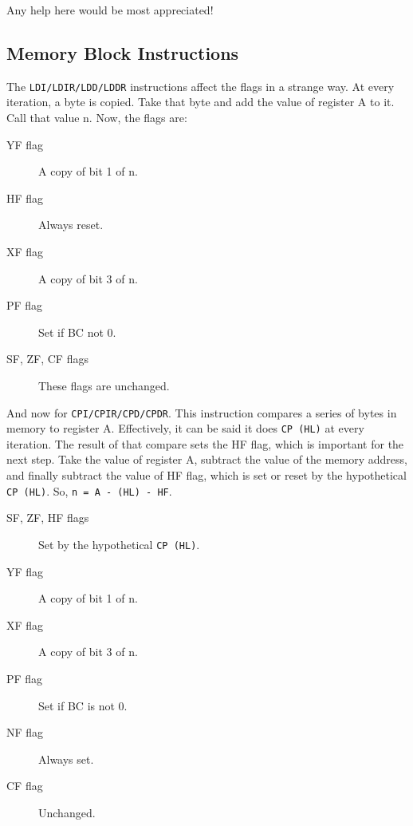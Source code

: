 \documentclass[twoside,openright,a4paper]{book}
\begin{document}
Any help here would be most appreciated!


\subsection{Memory Block Instructions \cite{mrison}}
\label{block_mem}

The {\tt LDI/LDIR/LDD/LDDR} instructions affect the flags in a strange way. At every iteration, a byte is copied. Take that byte and add the value of register A to it. Call that value n. Now, the flags are:

\begin{description}
 
	\item[YF flag]
	A copy of bit 1 of n.

	\item[HF flag]
	Always reset.

	\item[XF flag]
	A copy of bit 3 of n.

	\item[PF flag]
	Set if BC not 0.

	\item[SF, ZF, CF flags]
	These flags are unchanged.

\end{description}

And now for {\tt CPI/CPIR/CPD/CPDR}. This instruction compares a series of bytes in memory to register A. Effectively, it can be said it does {\tt CP (HL)} at every iteration. The result of that compare sets the HF flag, which is important for the next step. Take the value of register A, subtract the value of the memory address, and finally subtract the value of HF flag, which is set or reset by the hypothetical {\tt CP (HL)}. So, {\tt n = A - (HL) - HF}.

\begin{description}

	\item[SF, ZF, HF flags]
	Set by the hypothetical {\tt CP (HL)}.

	\item[YF flag]
	A copy of bit 1 of n.

	\item[XF flag]
	A copy of bit 3 of n.

	\item[PF flag]
	Set if BC is not 0.

	\item[NF flag]
	Always set.

	\item[CF flag]
	Unchanged.

\end{description}
\end{document}
